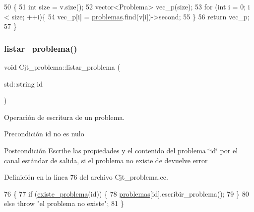 \begin{DoxyCode}
50                                                                        \{
51   \textcolor{keywordtype}{int} size = v.size();
52   vector<Problema> vec\_p(size);
53   \textcolor{keywordflow}{for} (\textcolor{keywordtype}{int} i = 0; i < size; ++i)\{
54     vec\_p[i] = \mbox{\hyperlink{class_cjt__problema_a2d471986320805c5b27f8d14d486fca8}{problemas}}.find(v[i])->second;
55   \}
56   \textcolor{keywordflow}{return} vec\_p;
57 \}
\end{DoxyCode}
\mbox{\label{class_cjt__problema_a72e742fbaa5618065f2e478b59bf3036}} 
\subsubsection{\texorpdfstring{listar\+\_\+problema()}{listar\_problema()}}
{\footnotesize\ttfamily void Cjt\+\_\+problema\+::listar\+\_\+problema (\begin{DoxyParamCaption}\item[{std\+::string}]{id }\end{DoxyParamCaption})}



Operación de escritura de un problema. 

\begin{DoxyPrecond}{Precondición}
id no es nulo 
\end{DoxyPrecond}
\begin{DoxyPostcond}{Postcondición}
Escribe las propiedades y el contenido del problema \char`\"{}id\char`\"{} por el canal estándar de salida, si el problema no existe de devuelve error 
\end{DoxyPostcond}


Definición en la línea 76 del archivo Cjt\+\_\+problema.\+cc.


\begin{DoxyCode}
76                                             \{
77     \textcolor{keywordflow}{if} (\mbox{\hyperlink{class_cjt__problema_a831be5b51e252520ee981b58d9ec00e9}{existe\_problema}}(\textcolor{keywordtype}{id})) \{
78       \mbox{\hyperlink{class_cjt__problema_a2d471986320805c5b27f8d14d486fca8}{problemas}}[id].escribir\_problema();
79     \}
80     \textcolor{keywordflow}{else} \textcolor{keywordflow}{throw} \textcolor{stringliteral}{"el problema no existe"};
81 \}
\end{DoxyCode}


